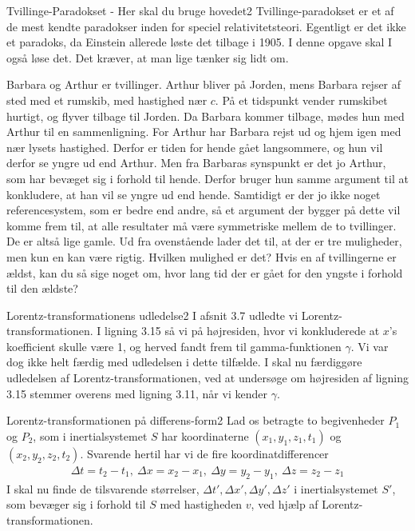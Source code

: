 \begin{opgave}{Tvillinge-Paradokset - Her skal du bruge hovedet}{2}
	Tvillinge-paradokset er et af de mest kendte paradokser inden for speciel relativitetsteori. Egentligt er det ikke
	et paradoks, da Einstein allerede løste det tilbage i 1905. I denne opgave skal I også løse det. Det kræver, at man
	lige tænker sig lidt om.
	
	Barbara og Arthur er tvillinger. Arthur bliver på Jorden, mens Barbara rejser af sted med et rumskib, med
	hastighed nær $c$. På et tidspunkt vender rumskibet hurtigt, og flyver tilbage til Jorden. Da Barbara kommer
	tilbage, mødes hun med Arthur til en sammenligning. For Arthur har Barbara rejst ud og hjem igen med nær
	lysets hastighed. Derfor er tiden for hende gået langsommere, og hun vil derfor se yngre ud end Arthur. Men
	fra Barbaras synspunkt er det jo Arthur, som har bevæget sig i forhold til hende. Derfor bruger hun samme
	argument til at konkludere, at han vil se yngre ud end hende. Samtidigt er der jo ikke noget referencesystem,
	som er bedre end andre, så et argument der bygger på dette vil komme frem til, at alle resultater må være
	symmetriske mellem de to tvillinger. De er altså lige gamle.
	\opg Ud fra ovenstående lader det til, at der er tre muligheder, men kun en kan være rigtig. Hvilken mulighed
	er det?
	\opg Hvis en af tvillingerne er ældst, kan du så sige noget om, hvor lang tid der er gået for den yngste i
	forhold til den ældste?
\end{opgave}


\begin{opgave}{Lorentz-transformationens udledelse}{2}
	I afsnit 3.7 udledte vi Lorentz-transformationen. I ligning 3.15 så vi på højresiden, hvor vi konkluderede at $x$'s koefficient skulle være 1, og herved fandt frem til gamma-funktionen $\gamma$. Vi var dog ikke helt færdig med udledelsen i dette tilfælde.
	\opg I skal nu færdiggøre udledelsen af Lorentz-transformationen, ved at undersøge om højresiden af ligning 3.15 stemmer overens med ligning 3.11, når vi kender $\gamma$.
\end{opgave}

\begin{opgave}{Lorentz-transformationen på differens-form}{2}
	\label{lorentz_diff}
	Lad os betragte to begivenheder $P_1$ og $P_2$, som i inertialsystemet $S$ har koordinaterne $(x_1,y_1,z_1,t_1)$ og $(x_2,y_2,z_2,t_2)$. Svarende hertil har vi de fire koordinatdifferencer
	\begin{align}
		\Delta t=t_2-t_1, \	 \Delta x=x_2-x_1, \ \Delta y=y_2-y_1, \ \Delta z= z_2-z_1 \nonumber
	\end{align}
	\opg I skal nu finde de tilsvarende størrelser,
	\begin{math}
		\Delta t',  \Delta x',  \Delta y',  \Delta z'
	\end{math}
	i inertialsystemet $S'$, som bevæger sig i forhold til $S$ med hastigheden $v$, ved hjælp af Lorentz-transformationen.
\end{opgave}

